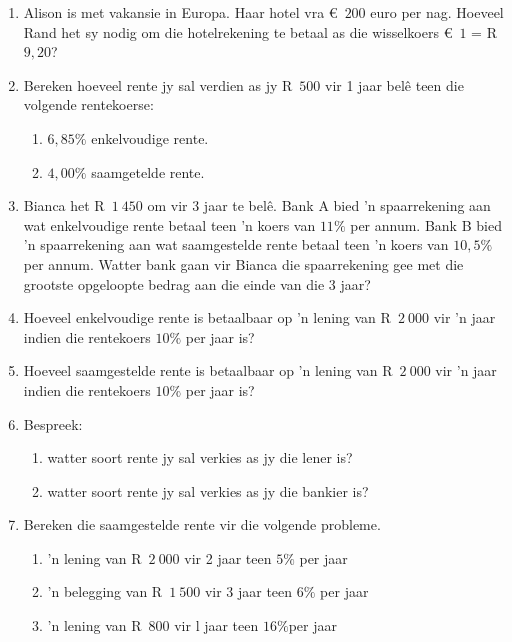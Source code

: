 \begin{eocexercises}{}
    \begin{enumerate}[label=\textbf{\arabic*}.]
	\item Alison is met vakansie in Europa. Haar hotel vra €~$200$ euro per nag. Hoeveel Rand het sy nodig om die hotelrekening te betaal as die wisselkoers  €~$1$ = R~$9,20$?

	\item Bereken hoeveel rente jy sal verdien as jy R~$500$ vir 1 jaar belê teen die volgende rentekoerse:
	\begin{enumerate}[noitemsep, label=\textbf{(\alph*)} ]
	    \item $6,85\%$ enkelvoudige rente.
	    \item $4,00\%$ saamgetelde rente.
	\end{enumerate}

	\item Bianca het R~$1~450$ om vir 3 jaar te belê. Bank A bied ’n spaarrekening aan wat enkelvoudige rente betaal
teen ’n koers van $11\%$ per annum. Bank B bied ’n spaarrekening aan wat saamgestelde rente betaal
teen ’n koers van $10,5\%$ per annum. Watter bank gaan vir Bianca die spaarrekening gee met die grootste
opgeloopte bedrag aan die einde van die 3 jaar?

	\item Hoeveel enkelvoudige rente is betaalbaar op ’n lening van R~$2~000$ vir ’n jaar indien die rentekoers $10\%$ per jaar is?

	\item Hoeveel saamgestelde rente is betaalbaar op ’n lening van  R~$2~000$ vir ’n jaar indien die rentekoers $10\%$ per jaar is?

	\item Bespreek:
	\begin{enumerate}[noitemsep, label=\textbf{(\alph*)} ]
	    \item watter soort rente jy sal verkies as jy die lener is?

	    \item watter soort rente jy sal verkies as jy die bankier is?
	\end{enumerate}

	\item Bereken die saamgestelde rente vir die volgende probleme.
	\begin{enumerate}[noitemsep, label=\textbf{(\alph*)} ]
	    \item ’n lening van R~$2~000$ vir 2 jaar teen  $5\%$ per jaar
	    \item ’n belegging van  R~$1~500$ vir 3 jaar teen $6\%$ per jaar
	    \item ’n lening van R~$800$ vir l jaar teen $16\%$per jaar
	\end{enumerate}


\end{enumerate}
\end{eocexercises}
